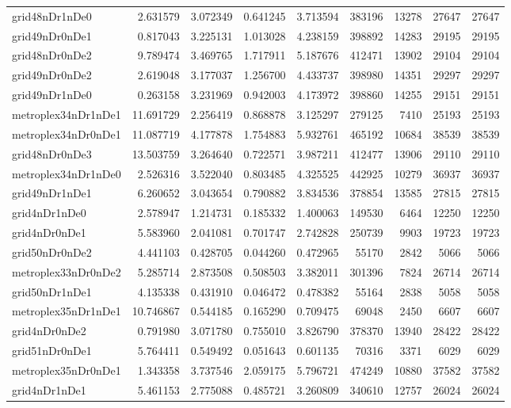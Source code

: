 \documentclass[../../../thesis.tex]{subfiles}
\begin{document}
\begin{longtable}{|l|r|r|r|r|r|r|r|r|}
grid48nDr1nDe0 & 2.631579 & 3.072349 & 0.641245 & 3.713594 & 383196 & 13278 & 27647 & 27647 \\
grid49nDr0nDe1 & 0.817043 & 3.225131 & 1.013028 & 4.238159 & 398892 & 14283 & 29195 & 29195 \\
grid48nDr0nDe2 & 9.789474 & 3.469765 & 1.717911 & 5.187676 & 412471 & 13902 & 29104 & 29104 \\
grid49nDr0nDe2 & 2.619048 & 3.177037 & 1.256700 & 4.433737 & 398980 & 14351 & 29297 & 29297 \\
grid49nDr1nDe0 & 0.263158 & 3.231969 & 0.942003 & 4.173972 & 398860 & 14255 & 29151 & 29151 \\
metroplex34nDr1nDe1 & 11.691729 & 2.256419 & 0.868878 & 3.125297 & 279125 & 7410 & 25193 & 25193 \\
metroplex34nDr0nDe1 & 11.087719 & 4.177878 & 1.754883 & 5.932761 & 465192 & 10684 & 38539 & 38539 \\
grid48nDr0nDe3 & 13.503759 & 3.264640 & 0.722571 & 3.987211 & 412477 & 13906 & 29110 & 29110 \\
metroplex34nDr1nDe0 & 2.526316 & 3.522040 & 0.803485 & 4.325525 & 442925 & 10279 & 36937 & 36937 \\
grid49nDr1nDe1 & 6.260652 & 3.043654 & 0.790882 & 3.834536 & 378854 & 13585 & 27815 & 27815 \\
grid4nDr1nDe0 & 2.578947 & 1.214731 & 0.185332 & 1.400063 & 149530 & 6464 & 12250 & 12250 \\
grid4nDr0nDe1 & 5.583960 & 2.041081 & 0.701747 & 2.742828 & 250739 & 9903 & 19723 & 19723 \\
grid50nDr0nDe2 & 4.441103 & 0.428705 & 0.044260 & 0.472965 & 55170 & 2842 & 5066 & 5066 \\
metroplex33nDr0nDe2 & 5.285714 & 2.873508 & 0.508503 & 3.382011 & 301396 & 7824 & 26714 & 26714 \\
grid50nDr1nDe1 & 4.135338 & 0.431910 & 0.046472 & 0.478382 & 55164 & 2838 & 5058 & 5058 \\
metroplex35nDr1nDe1 & 10.746867 & 0.544185 & 0.165290 & 0.709475 & 69048 & 2450 & 6607 & 6607 \\
grid4nDr0nDe2 & 0.791980 & 3.071780 & 0.755010 & 3.826790 & 378370 & 13940 & 28422 & 28422 \\
grid51nDr0nDe1 & 5.764411 & 0.549492 & 0.051643 & 0.601135 & 70316 & 3371 & 6029 & 6029 \\
metroplex35nDr0nDe1 & 1.343358 & 3.737546 & 2.059175 & 5.796721 & 474249 & 10880 & 37582 & 37582 \\
grid4nDr1nDe1 & 5.461153 & 2.775088 & 0.485721 & 3.260809 & 340610 & 12757 & 26024 & 26024 \\

\end{longtable}
\end{document}
